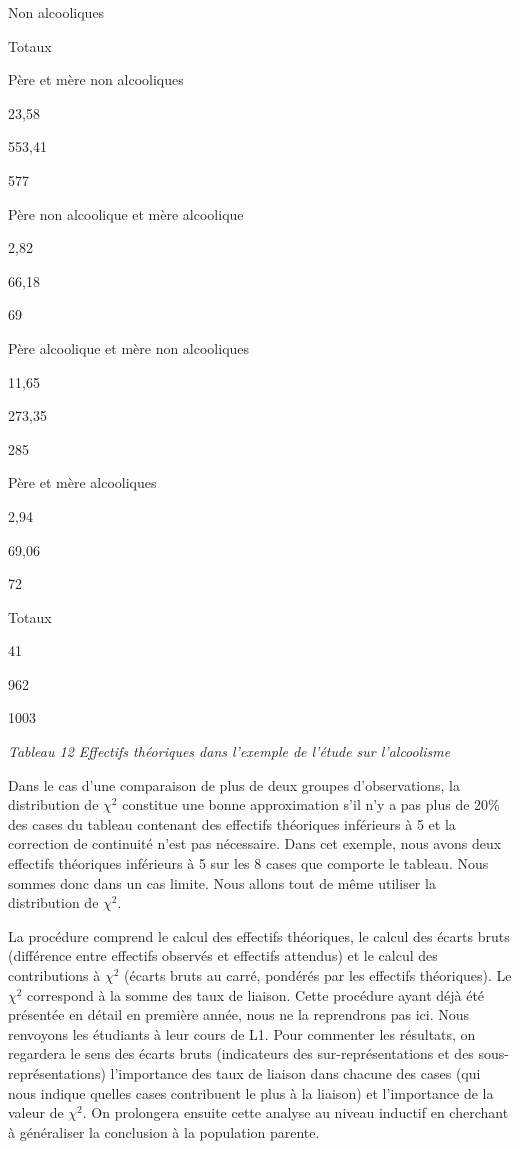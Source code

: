 \documentclass[]{book}
\theoremstyle{definition}
\theoremstyle{definition}
\theoremstyle{definition}
\theoremstyle{remark}
\begin{document}
Non alcooliques

Totaux

Père et mère non alcooliques

23,58

553,41

577

Père non alcoolique et mère alcoolique

2,82

66,18

69

Père alcoolique et mère non alcooliques

11,65

273,35

285

Père et mère alcooliques

2,94

69,06

72

Totaux

41

962

1003

\emph{Tableau 12 Effectifs théoriques dans l'exemple de l'étude sur
l'alcoolisme}

Dans le cas d'une comparaison de plus de deux groupes d'observations, la
distribution de \(\chi^{2}\) constitue une bonne approximation s'il n'y
a pas plus de 20\% des cases du tableau contenant des effectifs
théoriques inférieurs à 5 et la correction de continuité n'est pas
nécessaire. Dans cet exemple, nous avons deux effectifs théoriques
inférieurs à 5 sur les 8 cases que comporte le tableau. Nous sommes donc
dans un cas limite. Nous allons tout de même utiliser la distribution de
\(\chi^{2}\).

La procédure comprend le calcul des effectifs théoriques, le calcul des
écarts bruts (différence entre effectifs observés et effectifs attendus)
et le calcul des contributions à \(\chi^{2}\) (écarts bruts au carré,
pondérés par les effectifs théoriques). Le \(\chi^{2}\) correspond à la
somme des taux de liaison. Cette procédure ayant déjà été présentée en
détail en première année, nous ne la reprendrons pas ici. Nous renvoyons
les étudiants à leur cours de L1. Pour commenter les résultats, on
regardera le sens des écarts bruts (indicateurs des sur-représentations
et des sous-représentations) l'importance des taux de liaison dans
chacune des cases (qui nous indique quelles cases contribuent le plus à
la liaison) et l'importance de la valeur de \(\chi^{2}\). On prolongera
ensuite cette analyse au niveau inductif en cherchant à généraliser la
conclusion à la population parente.
\end{document}
